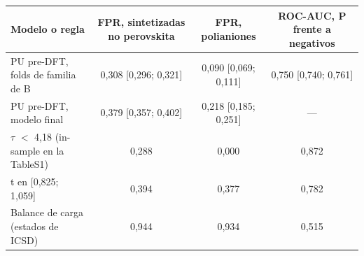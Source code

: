 \begin{tabular}{lccc}
\toprule
Modelo o regla & FPR, sintetizadas no perovskita & FPR, polianiones & ROC-AUC, P frente a negativos \\
\midrule
PU pre-DFT, folds de familia de B & 0,308 [0,296; 0,321] & 0,090 [0,069; 0,111] & 0,750 [0,740; 0,761] \\
PU pre-DFT, modelo final & 0,379 [0,357; 0,402] & 0,218 [0,185; 0,251] & — \\
$\tau$ $<$ 4,18 (in-sample en la TableS1) & 0,288 & 0,000 & 0,872 \\
t en [0,825; 1,059] & 0,394 & 0,377 & 0,782 \\
Balance de carga (estados de ICSD) & 0,944 & 0,934 & 0,515 \\
\bottomrule
\end{tabular}
